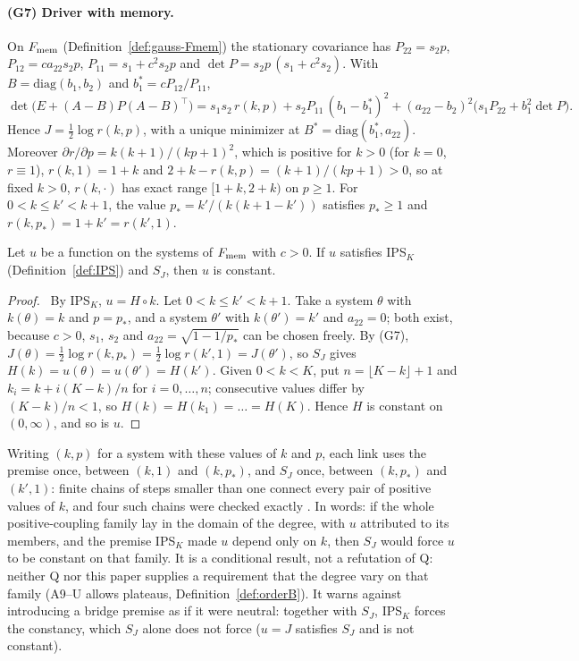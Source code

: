 \paragraph{(G7) Driver with memory.} On $F_{\rm mem}$ (Definition~\ref{def:gauss-Fmem}) the stationary covariance has $P_{22}=s_2p$, $P_{12}=ca_{22}s_2p$, $P_{11}=s_1+c^2s_2p$ and $\det P=s_2p\,(s_1+c^2s_2)$. With $B=\mathrm{diag}(b_1,b_2)$ and $b_1^*=cP_{12}/P_{11}$,
\begin{equation}
\det\bigl(E+(A-B)P(A-B)^\top\bigr)=s_1s_2\,r(k,p)+s_2P_{11}\,(b_1-b_1^*)^2+(a_{22}-b_2)^2\bigl(s_1P_{22}+b_1^2\det P\bigr).
\end{equation}
Hence $J=\tfrac12\log r(k,p)$, with a unique minimizer at $B^*=\mathrm{diag}(b_1^*,a_{22})$. Moreover $\partial r/\partial p=k(k+1)/(kp+1)^2$, which is positive for $k>0$ (for $k=0$, $r\equiv1$), $r(k,1)=1+k$ and $2+k-r(k,p)=(k+1)/(kp+1)>0$, so at fixed $k>0$, $r(k,\cdot)$ has exact range $[1+k,2+k)$ on $p\ge1$. For $0<k\le k'<k+1$, the value $p_*=k'/(k(k+1-k'))$ satisfies $p_*\ge1$ and $r(k,p_*)=1+k'=r(k',1)$. \stS
\begin{proposition}\label{prop:gauss-chains}
Let $u$ be a function on the systems of $F_{\rm mem}$ with $c>0$. If $u$ satisfies IPS$_K$ (Definition~\ref{def:IPS}) and $S_J$, then $u$ is constant.
\end{proposition}
\begin{proof}
\stA\ By IPS$_K$, $u=H\circ k$. Let $0<k\le k'<k+1$. Take a system $\theta$ with $k(\theta)=k$ and $p=p_*$, and a system $\theta'$ with $k(\theta')=k'$ and $a_{22}=0$; both exist, because $c>0$, $s_1$, $s_2$ and $a_{22}=\sqrt{1-1/p_*}$ can be chosen freely. By (G7), $J(\theta)=\tfrac12\log r(k,p_*)=\tfrac12\log r(k',1)=J(\theta')$, so $S_J$ gives $H(k)=u(\theta)=u(\theta')=H(k')$. Given $0<k<K$, put $n=\lfloor K-k\rfloor+1$ and $k_i=k+i(K-k)/n$ for $i=0,\dots,n$; consecutive values differ by $(K-k)/n<1$, so $H(k)=H(k_1)=\dots=H(K)$. Hence $H$ is constant on $(0,\infty)$, and so is $u$.
\end{proof}
Writing $(k,p)$ for a system with these values of $k$ and $p$, each link uses the premise once, between $(k,1)$ and $(k,p_*)$, and $S_J$ once, between $(k,p_*)$ and $(k',1)$: finite chains of steps smaller than one connect every pair of positive values of $k$, and four such chains were checked exactly \stS. In words: if the whole positive-coupling family lay in the domain of the degree, with $u$ attributed to its members, and the premise IPS$_K$ made $u$ depend only on $k$, then $S_J$ would force $u$ to be constant on that family. It is a conditional result, not a refutation of Q: neither Q nor this paper supplies a requirement that the degree vary on that family (A9--U allows plateaus, Definition~\ref{def:orderB}). It warns against introducing a bridge premise as if it were neutral: together with $S_J$, IPS$_K$ forces the constancy, which $S_J$ alone does not force ($u=J$ satisfies $S_J$ and is not constant).

